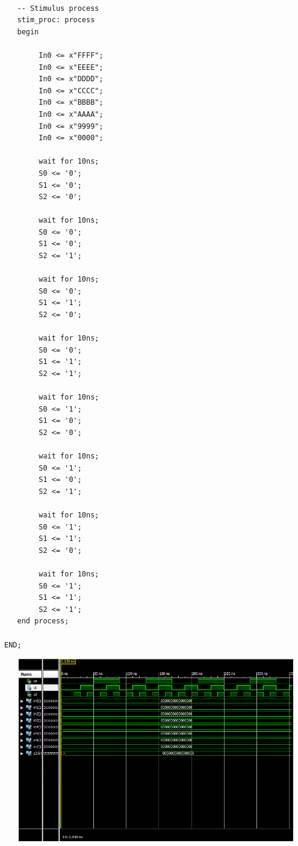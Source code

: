 \documentclass{article}
\begin{document}
\begin{lstlisting}
 
   -- Stimulus process
   stim_proc: process
   begin		
	
		In0 <= x"FFFF";
		In0 <= x"EEEE";
		In0 <= x"DDDD";
		In0 <= x"CCCC";
		In0 <= x"BBBB";
		In0 <= x"AAAA";
		In0 <= x"9999";
		In0 <= x"0000";
     
		wait for 10ns;
		S0 <= '0';
		S1 <= '0';
		S2 <= '0';
		
		wait for 10ns;
		S0 <= '0';
		S1 <= '0';
		S2 <= '1';
		
		wait for 10ns;
		S0 <= '0';
		S1 <= '1';
		S2 <= '0';
		
		wait for 10ns;
		S0 <= '0';
		S1 <= '1';
		S2 <= '1';
		
		wait for 10ns;
		S0 <= '1';
		S1 <= '0';
		S2 <= '0';
		
		wait for 10ns;
		S0 <= '1';
		S1 <= '0';
		S2 <= '1';
		
		wait for 10ns;
		S0 <= '1';
		S1 <= '1';
		S2 <= '0';
		
		wait for 10ns;
		S0 <= '1';
		S1 <= '1';
		S2 <= '1';
   end process;

END;
\end{lstlisting}
\includegraphics[width=16cm, height=8cm]{test_mux8.png}

	
\end{document}
